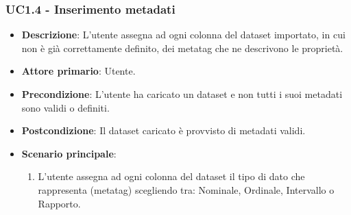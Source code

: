 \subsubsection{UC1.4 - Inserimento metadati}
\label{ssub:uc1.4}
\begin{itemize}
    \item \textbf{Descrizione}: L'utente assegna ad ogni colonna del dataset importato,
                                in cui non è già correttamente definito,
                                dei metatag che ne descrivono le proprietà.


    \item \textbf{Attore primario}: Utente.
    
    \item \textbf{Precondizione}:   L'utente ha caricato un dataset e non tutti i suoi metadati sono validi o definiti.
    \item \textbf{Postcondizione}:  Il dataset caricato è provvisto di metadati validi. 

	\item \textbf{Scenario principale}:
		\begin{enumerate}
            \item L'utente assegna ad ogni colonna del dataset il tipo di dato che rappresenta (metatag) scegliendo tra:
                    Nominale, Ordinale, Intervallo o Rapporto.
        \end{enumerate}

\end{itemize}

